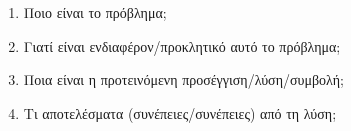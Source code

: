 \begin{enumerate}
  \item Ποιο είναι το πρόβλημα;
  \item Γιατί είναι ενδιαφέρον/προκλητικό αυτό το πρόβλημα;
  \item Ποια είναι η προτεινόμενη προσέγγιση/λύση/συμβολή;
  \item Τι αποτελέσματα (συνέπειες/συνέπειες) από τη λύση;
\end{enumerate}

